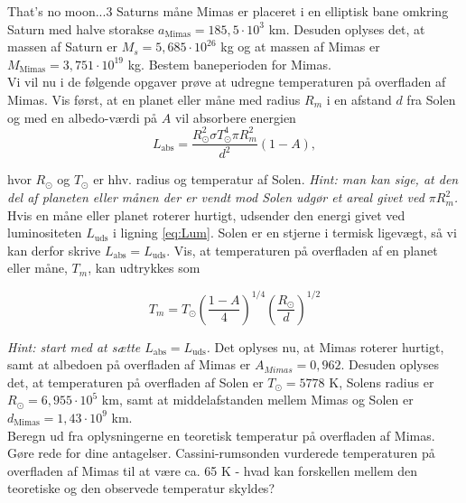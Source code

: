 \begin{opgave}{That's no moon...}{3}
  Saturns måne Mimas er placeret i en elliptisk bane omkring Saturn
  med halve storakse $a_\text{Mimas}=185,5\cdot 10^3$ km. Desuden
  oplyses det, at massen af Saturn er $M_s = 5,685\cdot 10^{26}$ kg og
  at massen af Mimas er $M_\text{Mimas} = 3,751\cdot 10^{19}$ kg.  \opg
  Bestem baneperioden for Mimas. \\
  Vi vil nu i de følgende opgaver prøve at udregne temperaturen på
  overfladen af Mimas.  \opg Vis først, at en planet eller måne med
  radius $R_m$ i en afstand $d$ fra Solen og med en albedo-værdi på
  $A$ vil absorbere energien
 \begin{equation}
 L_\text{abs} = \frac{R_\odot^2\sigma T_\odot^4 \pi R_m^2}{d^2} \left( 1 - A \right),
 \end{equation}
 
 hvor $R_\odot$ og $T_\odot$ er hhv. radius og temperatur af Solen. \emph{Hint: man kan sige, at den del af planeten eller månen der er vendt mod Solen udgør et areal givet ved $\pi R_m^2$.}
\opg Hvis en måne eller planet roterer hurtigt, udsender den energi givet ved luminositeten $L_\text{uds}$ i ligning \ref{eq:Lum}. Solen er en stjerne i termisk ligevægt, så vi kan derfor skrive $L_\text{abs}=L_\text{uds}$. Vis, at temperaturen på overfladen af en planet eller måne, $T_m$, kan udtrykkes som

\begin{equation}
T_m = T_\odot \left( \frac{1-A}{4} \right)^{1/4} \left(\frac{R_\odot}{d} \right)^{1/2}
\end{equation}

\emph{Hint: start med at sætte $L_\text{abs}=L_\text{uds}$.} 
 \opg Det oplyses nu, at Mimas roterer hurtigt, samt at albedoen på overfladen af Mimas er $A_{Mimas} = 0,962$. Desuden oplyses det, at temperaturen på overfladen af Solen er $T_\odot = 5778$ K, Solens radius er $R_\odot = 6,955\cdot 10^5$ km, samt at middelafstanden mellem Mimas og Solen er $d_{\text{Mimas}} = 1,43\cdot 10^9$ km. \\
Beregn ud fra oplysningerne en teoretisk temperatur på overfladen af Mimas. Gøre rede for dine antagelser. Cassini-rumsonden vurderede temperaturen på overfladen af Mimas til at være ca. 65 K - hvad kan forskellen mellem den teoretiske og den observede temperatur skyldes?
\end{opgave}

